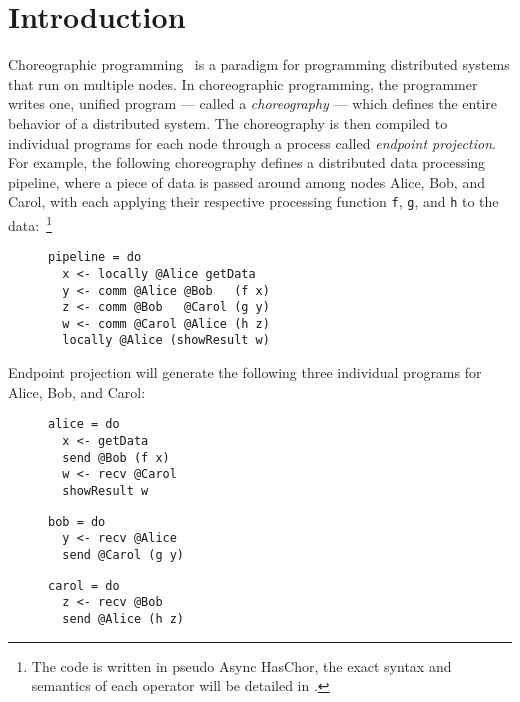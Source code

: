 \section{Introduction}

Choreographic programming~\citep{montesi-thesis, montesi-textbook} is a paradigm for programming distributed systems that run on multiple nodes.
%
In choreographic programming, the programmer writes one, unified program --- called a \emph{choreography} --- which defines the entire behavior of a distributed system.
%
The choreography is then compiled to individual programs for each node through a process called \emph{endpoint projection}.
%
For example, the following choreography defines a distributed data processing pipeline, where a piece of data is passed around among nodes Alice, Bob, and Carol, with each applying their respective processing function \texttt{f}, \texttt{g}, and \texttt{h} to the data:~\footnote{The code is written in pseudo Async HasChor, the exact syntax and semantics of each operator will be detailed in .}

\begin{figure}[h]
\centering
\begin{minipage}{0.4\textwidth}
\begin{verbatim}
pipeline = do
  x <- locally @Alice getData
  y <- comm @Alice @Bob   (f x)
  z <- comm @Bob   @Carol (g y)
  w <- comm @Carol @Alice (h z)
  locally @Alice (showResult w)
\end{verbatim}
\end{minipage}
\end{figure}

\noindent Endpoint projection will generate the following three individual programs for Alice, Bob, and Carol:

\begin{figure}[h]
\hspace{1cm}
\begin{minipage}[t]{0.3\textwidth}
\begin{verbatim}
alice = do
  x <- getData
  send @Bob (f x)
  w <- recv @Carol
  showResult w
\end{verbatim}
\end{minipage}
\begin{minipage}[t]{0.3\textwidth}
\begin{verbatim}
bob = do
  y <- recv @Alice
  send @Carol (g y)
\end{verbatim}
\end{minipage}
\begin{minipage}[t]{0.3\textwidth}
\begin{verbatim}
carol = do
  z <- recv @Bob
  send @Alice (h z)
\end{verbatim}
\end{minipage}
\end{figure}

